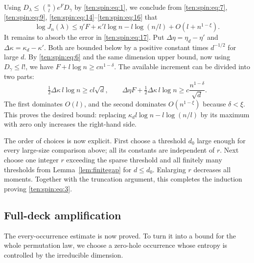 Using \(D_\lambda\le \binom n l e^F D_\gamma\) by \eqref{ten:spin:eq:1}, we conclude from \eqref{ten:spin:eq:7}, \eqref{ten:spin:eq:9}, \eqref{ten:spin:eq:14}--\eqref{ten:spin:eq:16} that
\begin{equation}
 \log J_n(\lambda)
 \le \eta' F+\kappa'l\log n-l\log(n/l)+O(l+n^{1-\xi}).
 \label{ten:spin:eq:17}
\end{equation}
It remains to absorb the error in \eqref{ten:spin:eq:17}. Put
$\Delta\eta=\eta_d-\eta'$ and $\Delta\kappa=\kappa_d-\kappa'$.
Both are bounded below by a positive constant times $d^{-1/2}$ for
large $d$. By \eqref{ten:spin:eq:6} and the same dimension upper
bound, now using $D_\gamma\le l!$, we have
$F+l\log n\ge c n^{1-\delta}$. The available increment can be
divided into two parts:
\[
 \tfrac12\Delta\kappa\,l\log n\ge c l\sqrt d,
 \qquad
 \Delta\eta F+\tfrac12\Delta\kappa\,l\log n
 \ge c\frac{n^{1-\delta}}{\sqrt d}.
\]
The first dominates $O(l)$, and the second dominates
$O(n^{1-\xi})$ because $\delta<\xi$. This proves the desired bound:
replacing $\kappa_d l\log n-l\log(n/l)$ by its maximum with zero
only increases the right-hand side.

The order of choices is now explicit. First choose a threshold $d_0$
large enough for every large-size comparison above; all its constants
are independent of $r$. Next choose one integer $r$ exceeding the sparse
threshold and all finitely many thresholds from
Lemma~\ref{lem:finitegap} for $d\le d_0$. Enlarging $r$ decreases
all moments. Together with the truncation argument, this completes the
induction proving \eqref{ten:spin:eq:3}.

\subsection{Full-deck amplification}
The every-occurrence estimate is now proved. To turn it into a bound
for the whole permutation law, we choose a zero-hole occurrence whose
entropy is controlled by the irreducible dimension.


